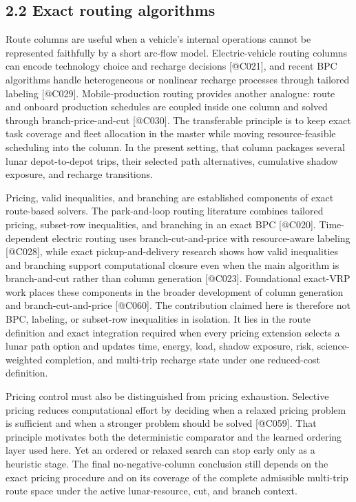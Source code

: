 \documentclass[
  11pt,
]{article}
\begin{document}
\hypertarget{exact-routing-algorithms}{%
\subsection{2.2 Exact routing
algorithms}\label{exact-routing-algorithms}}

Route columns are useful when a vehicle's internal operations cannot be
represented faithfully by a short arc-flow model. Electric-vehicle
routing columns can encode technology choice and recharge decisions
{[}@C021{]}, and recent BPC algorithms handle heterogeneous or nonlinear
recharge processes through tailored labeling {[}@C029{]}.
Mobile-production routing provides another analogue: route and onboard
production schedules are coupled inside one column and solved through
branch-price-and-cut {[}@C030{]}. The transferable principle is to keep
exact task coverage and fleet allocation in the master while moving
resource-feasible scheduling into the column. In the present setting,
that column packages several lunar depot-to-depot trips, their selected
path alternatives, cumulative shadow exposure, and recharge transitions.

Pricing, valid inequalities, and branching are established components of
exact route-based solvers. The park-and-loop routing literature combines
tailored pricing, subset-row inequalities, and branching in an exact BPC
{[}@C020{]}. Time-dependent electric routing uses branch-cut-and-price
with resource-aware labeling {[}@C028{]}, while exact
pickup-and-delivery research shows how valid inequalities and branching
support computational closure even when the main algorithm is
branch-and-cut rather than column generation {[}@C023{]}. Foundational
exact-VRP work places these components in the broader development of
column generation and branch-cut-and-price {[}@C060{]}. The contribution
claimed here is therefore not BPC, labeling, or subset-row inequalities
in isolation. It lies in the route definition and exact integration
required when every pricing extension selects a lunar path option and
updates time, energy, load, shadow exposure, risk, science-weighted
completion, and multi-trip recharge state under one reduced-cost
definition.

Pricing control must also be distinguished from pricing exhaustion.
Selective pricing reduces computational effort by deciding when a
relaxed pricing problem is sufficient and when a stronger problem should
be solved {[}@C059{]}. That principle motivates both the deterministic
comparator and the learned ordering layer used here. Yet an ordered or
relaxed search can stop early only as a heuristic stage. The final
no-negative-column conclusion still depends on the exact pricing
procedure and on its coverage of the complete admissible multi-trip
route space under the active lunar-resource, cut, and branch context.
\end{document}

